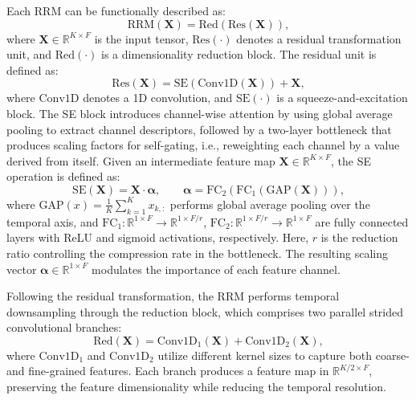 Each RRM can be functionally described as:
\begin{equation}
    \text{RRM}(\mathbf{X}) = \text{Red}(\text{Res}(\mathbf{X})),
\end{equation}
where $\mathbf{X} \in \mathbb{R}^{K \times F}$ is the input tensor, $\text{Res}(\cdot)$ denotes a residual transformation unit, and $\text{Red}(\cdot)$ is a dimensionality reduction block. The residual unit is defined as:
\begin{equation}
    \text{Res}(\mathbf{X}) = \text{SE}(\text{Conv1D}(\mathbf{X})) + \mathbf{X},
\end{equation}
where $\text{Conv1D}$ denotes a 1D convolution, and $\text{SE}(\cdot)$ is a squeeze-and-excitation block. The SE block introduces channel-wise attention by using global average pooling to extract channel descriptors, followed by a two-layer bottleneck that produces scaling factors for self-gating, i.e., reweighting each channel by a value derived from itself. Given an intermediate feature map $ \mathbf{X} \in \mathbb{R}^{K \times F} $, the SE operation is defined as:
\begin{equation}
    \text{SE}(\mathbf{X}) = \mathbf{X} \cdot \boldsymbol{\alpha}, \qquad \boldsymbol{\alpha} = \text{FC}_2\left(\text{FC}_1(\text{GAP}(\mathbf{X}))\right),
\end{equation}
where $\text{GAP}(x) = \frac{1}{K} \sum_{k=1}^{K} x_{k,:}$ performs global average pooling over the temporal axis, and $\text{FC}_1: \mathbb{R}^{1 \times F} \rightarrow \mathbb{R}^{1 \times F/r}$, $\text{FC}_2: \mathbb{R}^{1 \times F/r} \rightarrow \mathbb{R}^{1 \times F}$ are fully connected layers with ReLU and sigmoid activations, respectively. Here, $r$ is the reduction ratio controlling the compression rate in the bottleneck. The resulting scaling vector $\boldsymbol{\alpha} \in \mathbb{R}^{1 \times F}$ modulates the importance of each feature channel.

Following the residual transformation, the RRM performs temporal downsampling through the reduction block, which comprises two parallel strided convolutional branches:
\begin{equation}
    \text{Red}(\mathbf{X}) = \text{Conv1D}_1(\mathbf{X}) + \text{Conv1D}_2(\mathbf{X}),
\end{equation}
where $\text{Conv1D}_1$ and $\text{Conv1D}_2$ utilize different kernel sizes to capture both coarse- and fine-grained features. Each branch produces a feature map in $\mathbb{R}^{K/2 \times F}$, preserving the feature dimensionality while reducing the temporal resolution.

